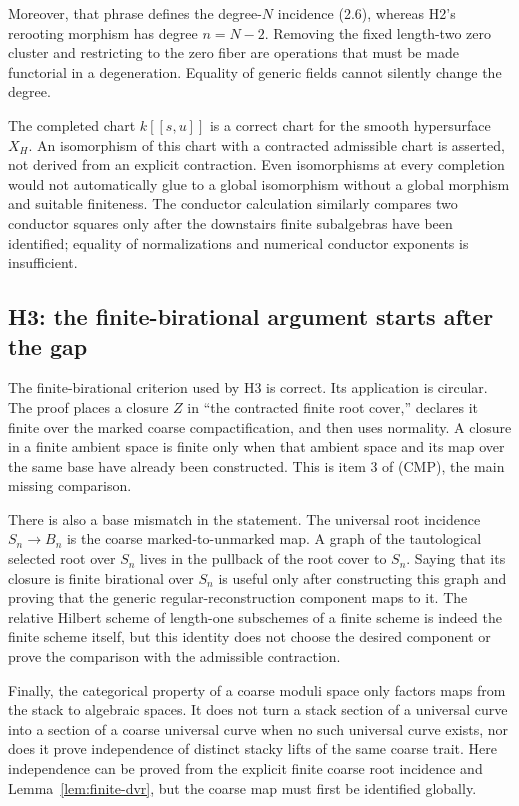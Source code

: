 \documentclass[11pt]{article}
\begin{document}
Moreover, that phrase defines the degree-$N$ incidence (2.6), whereas H2's
rerooting morphism has degree $n=N-2$.  Removing the fixed length-two zero
cluster and restricting to the zero fiber are operations that must be made
functorial in a degeneration.  Equality of generic fields cannot silently
change the degree.

The completed chart $k[[s,u]]$ is a correct chart for the smooth hypersurface
$X_H$.  An isomorphism of this chart with a contracted admissible chart is
asserted, not derived from an explicit contraction.  Even isomorphisms at
every completion would not automatically glue to a global isomorphism
without a global morphism and suitable finiteness.  The conductor calculation
similarly compares two conductor squares only after the downstairs finite
subalgebras have been identified; equality of normalizations and numerical
conductor exponents is insufficient.

\subsection{H3: the finite-birational argument starts after the gap}

The finite-birational criterion used by H3 is correct.  Its application is
circular.  The proof places a closure $Z$ in ``the contracted finite root
cover,'' declares it finite over the marked coarse compactification, and
then uses normality.  A closure in a finite ambient space is finite only when
that ambient space and its map over the same base have already been
constructed.  This is item 3 of (CMP), the main missing comparison.

There is also a base mismatch in the statement.  The universal root
incidence $S_n\to B_n$ is the coarse marked-to-unmarked map.  A graph of the
tautological selected root over $S_n$ lives in the pullback of the root cover
to $S_n$.  Saying that its closure is finite birational over $S_n$ is useful
only after constructing this graph and proving that the generic
regular-reconstruction component maps to it.  The relative Hilbert scheme
of length-one subschemes of a finite scheme is indeed the finite scheme
itself, but this identity does not choose the desired component or prove the
comparison with the admissible contraction.

Finally, the categorical property of a coarse moduli space only factors
maps from the stack to algebraic spaces.  It does not turn a stack section
of a universal curve into a section of a coarse universal curve when no such
universal curve exists, nor does it prove independence of distinct stacky
lifts of the same coarse trait.  Here independence can be proved from the
explicit finite coarse root incidence and Lemma~\ref{lem:finite-dvr}, but the
coarse map must first be identified globally.
\end{document}

